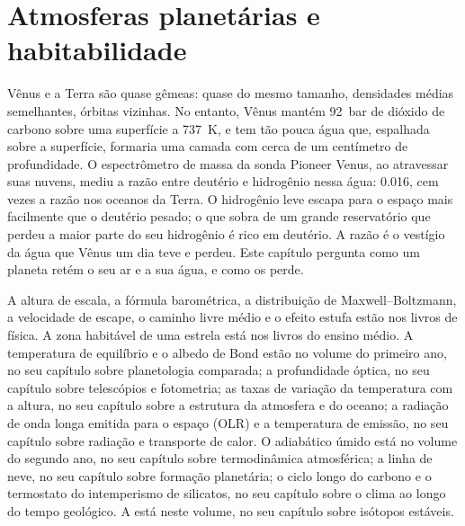\chapter{Atmosferas planetárias e habitabilidade}\label{ch:b3:planetary-atmospheres}

Vênus e a Terra são quase gêmeas: quase do mesmo tamanho, densidades médias semelhantes,
órbitas vizinhas. No entanto, Vênus mantém \qty{92}{bar} de dióxido de carbono
sobre uma superfície a \qty{737}{K}, e tem tão pouca água que, espalhada sobre a
superfície, formaria uma camada com cerca de um centímetro de profundidade. O
espectrômetro de massa da sonda Pioneer Venus, ao atravessar suas nuvens,
mediu a razão entre deutério e hidrogênio nessa água: \num{0.016}, cem vezes a
razão nos oceanos da Terra. O hidrogênio leve escapa para o espaço mais
facilmente que o deutério pesado; o que sobra de um grande reservatório
que perdeu a maior parte do seu hidrogênio é rico em deutério. A razão é o
vestígio da água que Vênus um dia teve e perdeu. Este capítulo pergunta como
um planeta retém o seu ar e a sua água, e como os perde.

\begin{recall}
A altura de escala, a fórmula barométrica, a distribuição de Maxwell--Boltzmann,
a velocidade de escape, o caminho livre médio e o efeito estufa estão nos livros
de física. A zona habitável de uma estrela está nos livros do ensino médio. A
temperatura de equilíbrio e o albedo de Bond estão no volume do primeiro ano, no
seu capítulo sobre planetologia comparada; a profundidade óptica, no seu capítulo
sobre telescópios e fotometria; as taxas de variação da temperatura com a altura,
no seu capítulo sobre a estrutura da atmosfera e do oceano; a radiação de onda
longa emitida para o espaço (OLR) e a temperatura de emissão, no seu capítulo
sobre radiação e transporte de calor. O adiabático úmido está no volume do segundo
ano, no seu capítulo sobre termodinâmica atmosférica; a linha de neve, no seu
capítulo sobre formação planetária; o ciclo longo do carbono e o termostato do
intemperismo de silicatos, no seu capítulo sobre o clima ao longo do tempo
geológico. A  está neste volume, no seu capítulo sobre
isótopos estáveis.
\end{recall}

